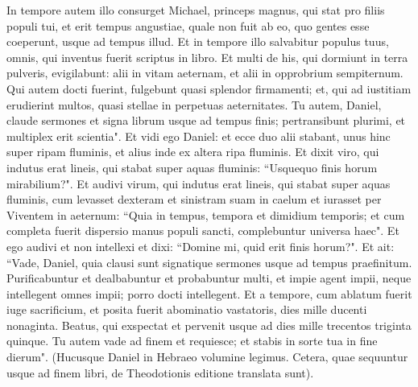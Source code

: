 \begin{biblechapter}  
\verse In tempore autem illo consurget Michael, princeps magnus, qui stat pro filiis populi tui, et erit tempus angustiae, quale non fuit ab eo, quo gentes esse coeperunt, usque ad tempus illud. Et in tempore illo salvabitur populus tuus, omnis, qui inventus fuerit scriptus in libro. 
\verse Et multi de his, qui dormiunt in terra pulveris, evigilabunt: alii in vitam aeternam, et alii in opprobrium sempiternum. 
\verse Qui autem docti fuerint, fulgebunt quasi splendor firmamenti; et, qui ad iustitiam erudierint multos, quasi stellae in perpetuas aeternitates. 
\verse Tu autem, Daniel, claude sermones et signa librum usque ad tempus finis; pertransibunt plurimi, et multiplex erit scientia". 
\verse Et vidi ego Daniel: et ecce duo alii stabant, unus hinc super ripam fluminis, et alius inde ex altera ripa fluminis. 
\verse Et dixit viro, qui indutus erat lineis, qui stabat super aquas fluminis: “Usquequo finis horum mirabilium?". 
\verse Et audivi virum, qui indutus erat lineis, qui stabat super aquas fluminis, cum levasset dexteram et sinistram suam in caelum et iurasset per Viventem in aeternum: “Quia in tempus, tempora et dimidium temporis; et cum completa fuerit dispersio manus populi sancti, complebuntur universa haec". 
\verse Et ego audivi et non intellexi et dixi: “Domine mi, quid erit finis horum?". 
\verse Et ait: “Vade, Daniel, quia clausi sunt signatique sermones usque ad tempus praefinitum.  
\verse Purificabuntur et dealbabuntur et probabuntur multi, et impie agent impii, neque intellegent omnes impii; porro docti intellegent. 
\verse Et a tempore, cum ablatum fuerit iuge sacrificium, et posita fuerit abominatio vastatoris, dies mille ducenti nonaginta. 
\verse Beatus, qui exspectat et pervenit usque ad dies mille trecentos triginta quinque. 
\verse Tu autem vade ad finem et requiesce; et stabis in sorte tua in fine dierum". (Hucusque Daniel in Hebraeo volumine legimus. Cetera, quae sequuntur usque ad finem libri, de Theodotionis editione translata sunt). 
\end{biblechapter}

